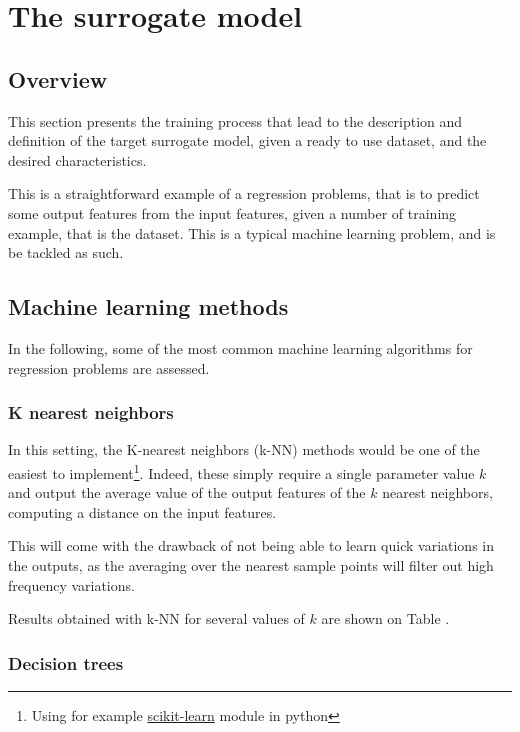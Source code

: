 \section{The surrogate model}

\subsection{Overview}

This section presents the training process that lead to the description and definition of the target surrogate model, given a ready to use dataset, and the desired characteristics.

This is a straightforward example of a regression problems, that is to predict some output features from the input features, given a number of training example, that is the dataset. This is a typical machine learning problem, and is be tackled as such.

\subsection{Machine learning methods}

In the following, some of the most common machine learning algorithms for regression problems \cite{machine-learning-class} are assessed.

\subsubsection{K nearest neighbors}

In this setting, the K-nearest neighbors (k-NN) methods would be one of the easiest to implement\footnote{Using for example \href{https://scikit-learn.org/stable/modules/neighbors.html\#nearest-neighbors-regression}{scikit-learn}\cite{scikit-learn} module in python}. Indeed, these simply require a single parameter value $k$ and output the average value of the output features of the $k$ nearest neighbors, computing a distance on the input features.

This will come with the drawback of not being able to learn quick variations in the outputs, as the averaging over the nearest sample points will filter out high frequency variations.

Results obtained with k-NN for several values of $k$ are shown on Table .

\subsubsection{Decision trees}

